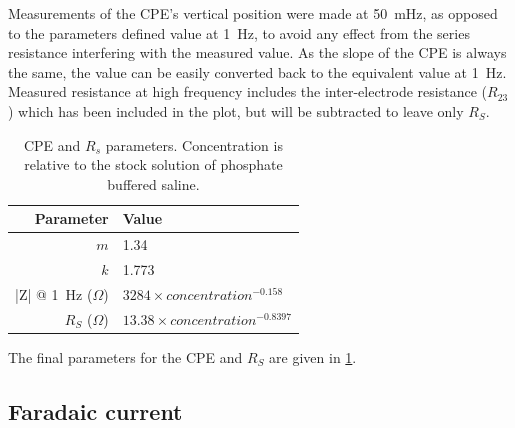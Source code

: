       Measurements of the CPE's vertical position were made at \SI{50}{\milli\hertz}, as opposed to the parameters defined value at \SI{1}{\hertz}, to avoid any effect from the series resistance interfering with the measured value.
      As the slope of the CPE is always the same, the value can be easily converted back to the equivalent value at \SI{1}{\hertz}.
      Measured resistance at high frequency includes the inter-electrode resistance ($R_{23}$) which has been included in the plot, but will be subtracted to leave only $R_{S}$.
      \begin{table}
        \centering
        \begin{tabular}{r | l}
          Parameter & Value \\
          \hline
          $m$& 1.34\\
          $k$ & 1.773\\
          |Z| @ \SI{1}{\hertz} ($\Omega$)& $3284 \times concentration^{-0.158}$ \\
          $R_{S}$ ($\Omega$)& $13.38 \times concentration^{-0.8397}$
        \end{tabular}
        \caption{\label{tab:CPEparams}CPE and $R_{s}$ parameters. Concentration is relative to the stock solution of phosphate buffered saline.}
      \end{table}
      The final parameters for the CPE and $R_{S}$ are given in \cref{tab:CPEparams}.


    \subsection{Faradaic current}


